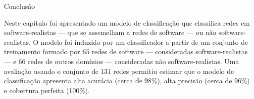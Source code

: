 \begin{section}{Conclusão} \label{cap:clas5}

	Neste capítulo foi apresentado um modelo de classificação que classifica redes em software-realistas --- que se assemelham a redes de software --- ou não software-realistas. O modelo foi induzido por um classificador a partir de um conjunto de treinamento formado por 65 redes de software --- consideradas software-realistas --- e 66 redes de outros domínios --- consideradas não software-realistas. Uma avaliação usando o conjunto de 131 redes permitiu estimar que o modelo de classificação apresenta alta acurácia (cerca de 98\%), alta precisão (cerca de 96\%) e cobertura perfeita (100\%). 

	
\end{section}

